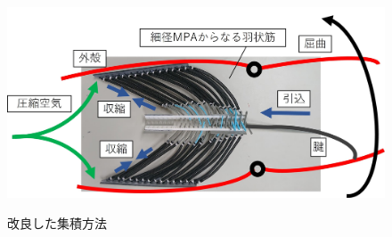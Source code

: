 \begin{figure}[t]
\begin{minipage}{0.5\hsize}
  \end{minipage}
    \hspace{-5mm}
  \begin{minipage}{0.5\hsize}
    \centering
    \includegraphics[scale=0.07]{image/mosiki.JPG}
    \label{fig:jmosiki}
  \end{minipage}
  \caption{改良した集積方法}
  \label{fig:syusekijikki}
\end{figure}
